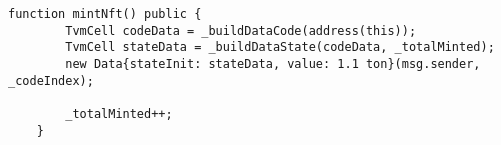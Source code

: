

\begin{lstlisting}[firstnumber=25]
    function mintNft() public {
        TvmCell codeData = _buildDataCode(address(this));
        TvmCell stateData = _buildDataState(codeData, _totalMinted);
        new Data{stateInit: stateData, value: 1.1 ton}(msg.sender, _codeIndex);

        _totalMinted++;
    }
\end{lstlisting}
